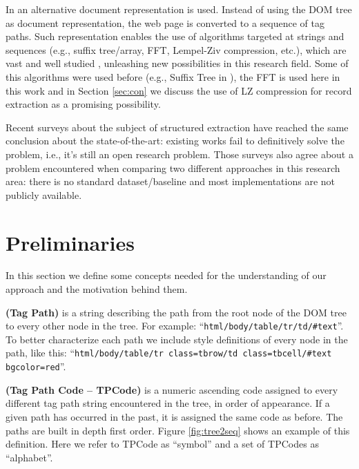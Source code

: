 In \cite{TPC09, SuffixTree12, TPS2013} an alternative document representation is
used. Instead of using the DOM tree as document representation, the web page
is converted to a sequence of tag paths. Such representation enables the use of
algorithms targeted at strings and sequences (e.g., suffix
tree/array\cite{ukkonen1995, manber1993suffix}, FFT\cite{fft1965}, Lempel-Ziv
compression\cite{ziv1977universal}, etc.), which are vast and well studied
\cite{gusfield1997algorithms}, unleashing new possibilities in this research
field. Some of this algorithms were used before (e.g., Suffix Tree in
\cite{SuffixTree12}), the FFT is used here in this work and in Section
\ref{sec:con} we discuss the use of LZ compression for record extraction as a
promising possibility.

Recent surveys\cite{survey2013, survey2014} about the subject of structured
extraction have reached the same conclusion about the state-of-the-art: existing
works fail to definitively solve the problem, i.e., it's still an open research
problem. Those surveys also agree about a problem encountered when comparing
two different approaches in this research area: there is no standard
dataset/baseline and most implementations are not publicly available.

\section{Preliminaries}\label{sec:defs}
In this section we define some concepts needed for the understanding of our
approach and the motivation behind them.

\begin{definition}\textbf{(Tag Path)} is a string describing the path from the
root node of the DOM tree to every other node in the tree. For example:
``\texttt{html/body/table/tr/td/\#text}''. To better characterize each path we
include style definitions of every node in the path, like this:
``\texttt{html/body/table/tr class=tbrow/td class=tbcell/\#text bgcolor=red}''.
\end{definition}

\begin{definition}\textbf{(Tag Path Code -- TPCode)}\label{def:tpc} is a numeric
ascending code assigned to every different tag path string encountered in the
tree, in order of appearance. If a given path has occurred in the past, it is
assigned the same code as before. The paths are built in depth first order.
Figure \ref{fig:tree2seq} shows an example of this definition. Here we refer to
TPCode as ``symbol'' and a set of TPCodes as ``alphabet''.
\end{definition}

